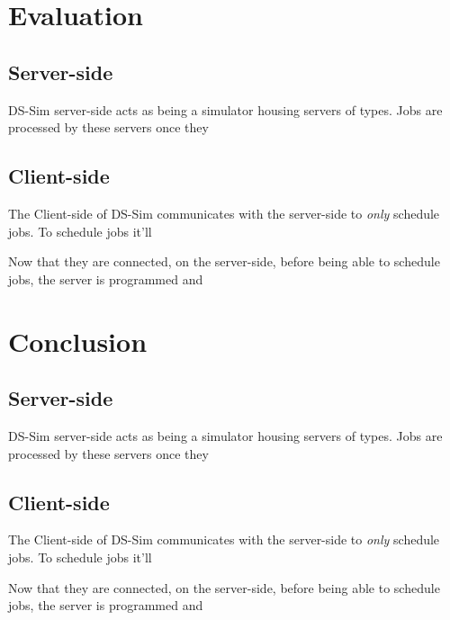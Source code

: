 \documentclass[a4paper]{article} %
\begin{document}

\section{Evaluation}
\label{sec:section2}
\subsection*{Server-side}
DS-Sim server-side acts as being a simulator housing servers of types. Jobs are processed by these servers once they 

\subsection*{Client-side}
The Client-side of DS-Sim communicates with the server-side to \textit{only} schedule jobs. To schedule jobs it'll 

\bigskip
Now that they are connected, on the server-side, before being able to schedule jobs, the server is programmed and 


\section{Conclusion}
\label{sec:section2}
\subsection*{Server-side}
DS-Sim server-side acts as being a simulator housing servers of types. Jobs are processed by these servers once they 

\subsection*{Client-side}
The Client-side of DS-Sim communicates with the server-side to \textit{only} schedule jobs. To schedule jobs it'll 

\bigskip
Now that they are connected, on the server-side, before being able to schedule jobs, the server is programmed and 


\break



\end{document}
